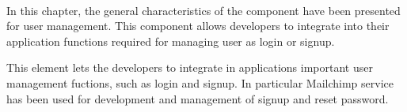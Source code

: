 \paragraph{}
In this chapter, the general characteristics of the component have been presented for user management.
This component allows developers to integrate into their application functions required for managing user as login or signup.

This element lets the developers to integrate in applications important user management fuctions, such as login and signup.
In particular Mailchimp service has been used for development and management of signup and reset password.
